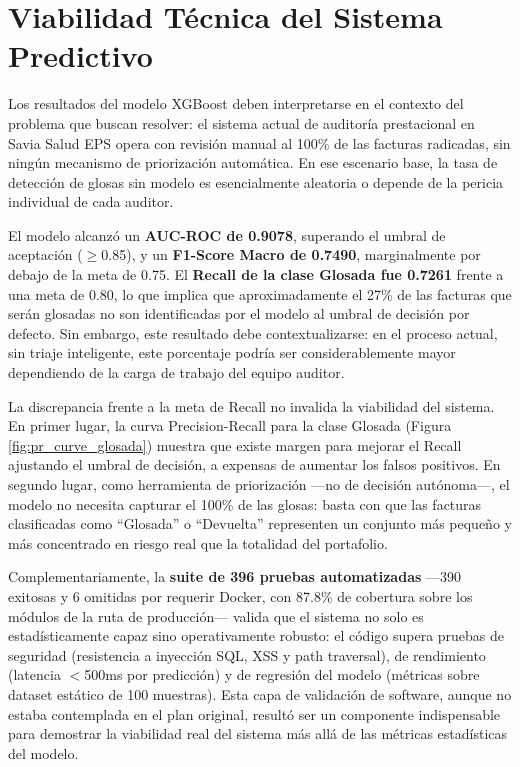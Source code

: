 \documentclass[12pt,letterpaper]{report}
\begin{document}
\section{Viabilidad Técnica del Sistema Predictivo}

Los resultados del modelo XGBoost deben interpretarse en el contexto del problema que buscan resolver: el sistema actual de auditoría prestacional en Savia Salud EPS opera con revisión manual al 100\% de las facturas radicadas, sin ningún mecanismo de priorización automática. En ese escenario base, la tasa de detección de glosas sin modelo es esencialmente aleatoria o depende de la pericia individual de cada auditor.

El modelo alcanzó un \textbf{AUC-ROC de 0.9078}, superando el umbral de aceptación ($\geq$0.85), y un \textbf{F1-Score Macro de 0.7490}, marginalmente por debajo de la meta de 0.75. El \textbf{Recall de la clase Glosada fue 0.7261} frente a una meta de 0.80, lo que implica que aproximadamente el 27\% de las facturas que serán glosadas no son identificadas por el modelo al umbral de decisión por defecto. Sin embargo, este resultado debe contextualizarse: en el proceso actual, sin triaje inteligente, este porcentaje podría ser considerablemente mayor dependiendo de la carga de trabajo del equipo auditor.

La discrepancia frente a la meta de Recall no invalida la viabilidad del sistema. En primer lugar, la curva Precision-Recall para la clase Glosada (Figura \ref{fig:pr_curve_glosada}) muestra que existe margen para mejorar el Recall ajustando el umbral de decisión, a expensas de aumentar los falsos positivos. En segundo lugar, como herramienta de priorización —no de decisión autónoma—, el modelo no necesita capturar el 100\% de las glosas: basta con que las facturas clasificadas como ``Glosada'' o ``Devuelta'' representen un conjunto más pequeño y más concentrado en riesgo real que la totalidad del portafolio.

Complementariamente, la \textbf{suite de 396 pruebas automatizadas} —390 exitosas y 6 omitidas por requerir Docker, con 87.8\% de cobertura sobre los módulos de la ruta de producción— valida que el sistema no solo es estadísticamente capaz sino operativamente robusto: el código supera pruebas de seguridad (resistencia a inyección SQL, XSS y path traversal), de rendimiento (latencia $<$500ms por predicción) y de regresión del modelo (métricas sobre dataset estático de 100 muestras). Esta capa de validación de software, aunque no estaba contemplada en el plan original, resultó ser un componente indispensable para demostrar la viabilidad real del sistema más allá de las métricas estadísticas del modelo.
\end{document}
